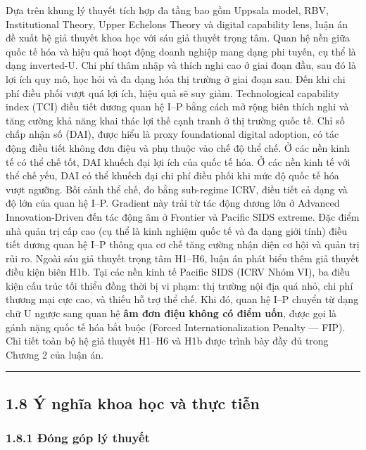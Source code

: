 \documentclass[12pt,a4paper]{article}
\begin{document}
Dựa trên khung lý thuyết tích hợp đa tầng bao gồm Uppsala model, RBV,
Institutional Theory, Upper Echelons Theory và digital capability lens,
luận án đề xuất hệ giả thuyết khoa học với sáu giả thuyết trọng tâm.
Quan hệ nền giữa quốc tế hóa và hiệu quả hoạt động doanh nghiệp mang
dạng phi tuyến, cụ thể là dạng inverted-U. Chi phí thâm nhập và thích
nghi cao ở giai đoạn đầu, sau đó là lợi ích quy mô, học hỏi và đa dạng
hóa thị trường ở giai đoạn sau. Đến khi chi phí điều phối vượt quá lợi
ích, hiệu quả sẽ suy giảm. Technological capability index (TCI) điều
tiết dương quan hệ I--P bằng cách mở rộng biên thích nghi và tăng cường
khả năng khai thác lợi thế cạnh tranh ở thị trường quốc tế. Chỉ số chấp
nhận số (DAI), được hiểu là proxy foundational digital adoption, có tác
động điều tiết không đơn điệu và phụ thuộc vào chế độ thể chế. Ở các nền
kinh tế có thể chế tốt, DAI khuếch đại lợi ích của quốc tế hóa. Ở các
nền kinh tế với thể chế yếu, DAI có thể khuếch đại chi phí điều phối khi
mức độ quốc tế hóa vượt ngưỡng. Bối cảnh thể chế, đo bằng sub-regime
ICRV, điều tiết cả dạng và độ lớn của quan hệ I--P. Gradient này trải từ
tác động dương lớn ở Advanced Innovation-Driven đến tác động âm ở
Frontier và Pacific SIDS extreme. Đặc điểm nhà quản trị cấp cao (cụ thể
là kinh nghiệm quốc tế và đa dạng giới tính) điều tiết dương quan hệ
I--P thông qua cơ chế tăng cường nhận diện cơ hội và quản trị rủi ro.
Ngoài sáu giả thuyết trọng tâm H1--H6, luận án phát biểu thêm giả thuyết
điều kiện biên H1b. Tại các nền kinh tế Pacific SIDS (ICRV Nhóm VI), ba
điều kiện cấu trúc tối thiểu đồng thời bị vi phạm: thị trường nội địa
quá nhỏ, chi phí thương mại cực cao, và thiếu hỗ trợ thể chế. Khi đó,
quan hệ I--P chuyển từ dạng chữ U ngược sang quan hệ \textbf{âm đơn điệu
không có điểm uốn}, được gọi là gánh nặng quốc tế hóa bắt buộc (Forced
Internationalization Penalty --- FIP). Chi tiết toàn bộ hệ giả thuyết
H1--H6 và H1b được trình bày đầy đủ trong Chương 2 của luận án.

\begin{center}\rule{0.5\linewidth}{0.5pt}\end{center}

\hypertarget{18-uxfd-nghux129a-khoa-hux1ecdc-vuxe0-thux1ef1c-tiux1ec5n}{%
\subsection{1.8 Ý nghĩa khoa học và thực
tiễn}\label{18-uxfd-nghux129a-khoa-hux1ecdc-vuxe0-thux1ef1c-tiux1ec5n}}

\hypertarget{181-ux111uxf3ng-guxf3p-luxfd-thuyux1ebft}{%
\subsubsection{1.8.1 Đóng góp lý
thuyết}\label{181-ux111uxf3ng-guxf3p-luxfd-thuyux1ebft}}
\end{document}
